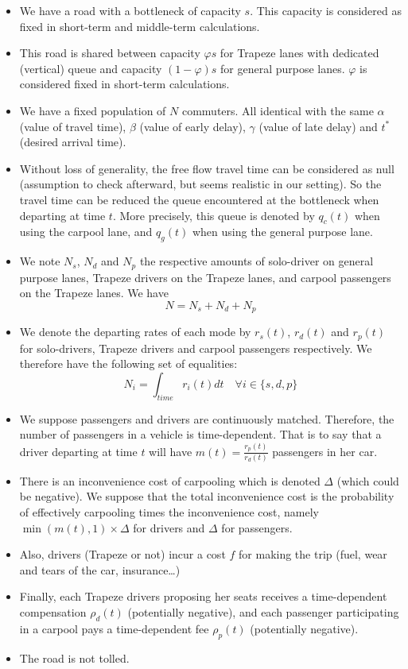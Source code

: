 \documentclass[english, a4paper]{article}
\theoremstyle{plain}
\begin{document}
\begin{itemize}
    \item We have a road with a bottleneck of capacity $s$. This capacity is considered as fixed in short-term and middle-term calculations.
    \item This road is shared between capacity $\varphi s$ for Trapeze lanes with dedicated (vertical) queue and capacity $(1-\varphi) s$ for general purpose lanes. $\varphi$ is considered fixed in short-term calculations.
    \item We have a fixed population of $N$ commuters. All identical with the same $\alpha$ (value of travel time), $\beta$ (value of early delay), $\gamma$ (value of late delay) and $t^*$ (desired arrival time).
    \item Without loss of generality, the free flow travel time can be considered as null (assumption to check afterward, but seems realistic in our setting). So the travel time can be reduced the queue encountered at the bottleneck when departing at time $t$. More precisely, this queue is denoted by $q_c(t)$ when using the carpool lane, and $q_g(t)$ when using the general purpose lane.
    \item We note $N_s$, $N_d$ and $N_p$ the respective amounts of solo-driver on general purpose lanes, Trapeze drivers on the Trapeze lanes, and carpool passengers on the Trapeze lanes. We have
    \begin{equation}
        N = N_s + N_d + N_p
    \end{equation}
    \item We denote the departing rates of each mode by $r_s(t)$, $r_d(t)$ and $r_p(t)$ for solo-drivers, Trapeze drivers and carpool passengers respectively. We therefore have the following set of equalities:
    \begin{equation}
        N_i = \int_{time} r_i(t)dt \quad \forall i \in \{s, d, p\}
    \end{equation}
    \item We suppose passengers and drivers are continuously matched. Therefore, the number of passengers in a vehicle is time-dependent. That is to say that a driver departing at time $t$ will have $m(t)=\frac{r_p(t)}{r_d(t)}$ passengers in her car.
    \item There is an inconvenience cost of carpooling which is denoted $\Delta$ (which could be negative). We suppose that the total inconvenience cost is the probability of effectively carpooling times the inconvenience cost, namely $\min (m(t), 1) \times \Delta$ for drivers and $\Delta$ for passengers.
    \item Also, drivers (Trapeze or not) incur a cost $f$ for making the trip (fuel, wear and tears of the car, insurance…)
    \item Finally, each Trapeze drivers proposing her seats receives a time-dependent compensation $\rho_d(t)$ (potentially negative), and each passenger participating in a carpool pays a time-dependent fee $\rho_p(t)$ (potentially negative).
    \item The road is not tolled.
\end{itemize}
\end{document}
